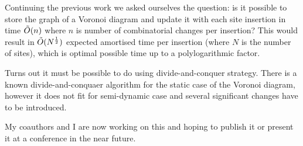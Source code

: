 \documentclass[a4paper,11pt]{article}
\theoremstyle{definition}
\begin{document}
Continuing the previous work we asked ourselves the question: is it possible to store the graph of a Voronoi diagram and update it with each site insertion in time $\tilde O(n)$ where $n$ is number of combinatorial changes per insertion? This would result in $\tilde O(N^\frac12)$ expected amortised time per insertion (where $N$ is the number of sites), which is optimal possible time up to a polylogarithmic factor.

Turns out it must be possible to do using divide-and-conquer strategy. There is a known divide-and-conquaer algorithm for the static case of the Voronoi diagram, however it does not fit for semi-dynamic case and several significant changes have to be introduced.

My coauthors and I are now working on this and hoping to publish it or present it at a conference in the near future.
\end{document}
